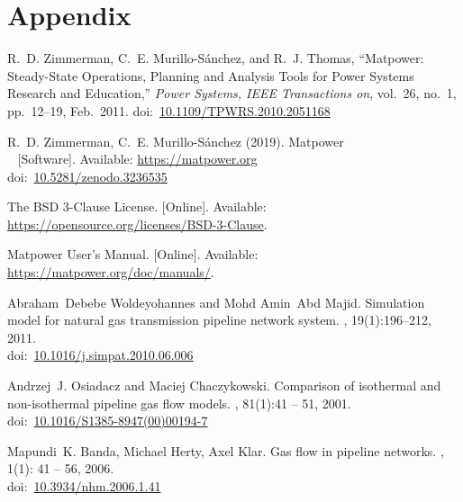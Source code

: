 \documentclass[12pt,a4paper,oneside]{book}
\newcommand{\matpower}[0]{{\sc Matpower}}
\newcommand{\doi}[1]{doi:~\href{https://doi.org/#1}{#1}}
\begin{document}
	
	\tableofcontents                            
	\listoffigures
	\listoftables	
	
	
	
	
	
	\part*{Appendix}
		
	
	\clearpage	
	\begin{thebibliography}{99}
	R.~D. Zimmerman, C.~E. Murillo-S{\'a}nchez, and R.~J. Thomas, ``\matpower{}: Steady-State Operations, Planning and Analysis Tools for Power Systems Research and Education,'' \emph{Power Systems, IEEE Transactions on}, vol.~26, no.~1, pp.~12--19, Feb.~2011.
	\doi{10.1109/TPWRS.2010.2051168}
	
	R.~D. Zimmerman, C.~E. Murillo-S{\'a}nchez (2019). \matpower{}\\~
	[Software]. Available: \url{https://matpower.org}\\
	\doi{10.5281/zenodo.3236535}
	
	The BSD 3-Clause License. [Online]. Available: \url{https://opensource.org/licenses/BSD-3-Clause}.
	
	\matpower{} User's Manual. [Online]. Available: \url{https://matpower.org/doc/manuals/}.
	
	Abraham~Debebe Woldeyohannes and Mohd Amin~Abd Majid.
	\newblock Simulation model for natural gas transmission pipeline network
	system.
	, 19(1):196--212, 2011.\\
	\doi{10.1016/j.simpat.2010.06.006}	
	
	Andrzej~J. Osiadacz and Maciej Chaczykowski.
	\newblock Comparison of isothermal and non-isothermal pipeline gas flow models. 
	, 81(1):41 -- 51, 2001.\\
	\doi{10.1016/S1385-8947(00)00194-7}	
	
	Mapundi~K. Banda, Michael Herty, Axel Klar.
	\newblock Gas flow in pipeline networks.
	, 1(1): 41 -- 56, 2006.\\
	\doi{10.3934/nhm.2006.1.41} 
	

\end{thebibliography}
\end{document}
